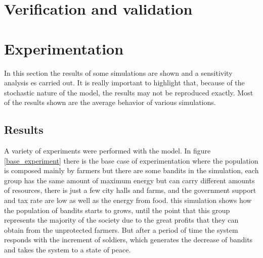 \documentclass{wscpaperproc}
\begin{document}
\section{Verification and validation}

\section{Experimentation}

In this section the results of some simulations are shown and a sensitivity
analysis es carried out. It is really important to highlight that, because
of the stochastic nature of the model, the results may not be reproduced
exactly. Most of the results shown are the average behavior of various
simulations.

\subsection{Results}

A variety of experiments were performed with the model. In figure
\ref{base_experiment} there is the base case of experimentation where the
population is composed mainly by farmers but there are some bandits in the
simulation, each group has the same amount of maximum energy but can carry
different amounts of resources, there is just a few city halls and farms, and
the government support and tax rate are low as well as the energy from food.
this simulation shows how the population of bandits starts to grows, until the
point that this group represents the majority of the society due to the great
profits that they can obtain from the unprotected farmers. But after a period
of time the system responds with the increment of soldiers, which generates the
decrease of bandits and takes the system to a state of peace.
\end{document}

